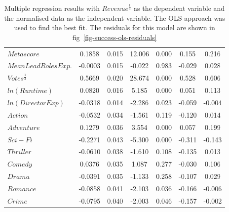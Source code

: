 \begin{table}[H]
\begin{center}
\begin{tabular}{lcccccc}
                    \textbf{$Metascore$}            & 0.1858        & 0.015            & 12.006     & 0.000               & 0.155           & 0.216           \\
                    \textbf{$Mean Lead Roles Exp.$} & -0.0003       & 0.015            & -0.022     & 0.983               & -0.029          & 0.028           \\
                    \textbf{$Votes^{\frac{1}{3}}$}  & 0.5669        & 0.020            & 28.674     & 0.000               & 0.528           & 0.606           \\
                    \textbf{$ln(Runtime)$}          & 0.0820        & 0.016            & 5.185      & 0.000               & 0.051           & 0.113           \\
                    \textbf{$ln(Director Exp)$}     & -0.0318       & 0.014            & -2.286     & 0.023               & -0.059          & -0.004          \\
                    \textbf{$Action$}               & -0.0532       & 0.034            & -1.561     & 0.119               & -0.120          & 0.014           \\
                    \textbf{$Adventure$}            & 0.1279        & 0.036            & 3.554      & 0.000               & 0.057           & 0.199           \\
                    \textbf{$Sci-Fi$}               & -0.2271       & 0.043            & -5.300     & 0.000               & -0.311          & -0.143          \\
                    \textbf{$Thriller$}             & -0.0610       & 0.038            & -1.610     & 0.108               & -0.135          & 0.013           \\
                    \textbf{$Comedy$}               & 0.0376        & 0.035            & 1.087      & 0.277               & -0.030          & 0.106           \\
                    \textbf{$Drama$}                & -0.0391       & 0.035            & -1.133     & 0.258               & -0.107          & 0.029           \\
                    \textbf{$Romance$}              & -0.0858       & 0.041            & -2.103     & 0.036               & -0.166          & -0.006          \\
                    \textbf{$Crime$}                & -0.0795       & 0.040            & -2.003     & 0.046               & -0.157          & -0.002          \\
                    \bottomrule
                \end{tabular}
            \end{center}
            \caption[short]{Multiple regression results with $Revenue^{\frac{1}{3}}$ as the dependent variable
            and the normalised data as the independent variable.
            The OLS approach was used to find the best fit.
            The residuals for this model are shown in
                fig~\ref{fig-success-ols-residuals}}\label{tab-success-ols-summary} \end{table}
